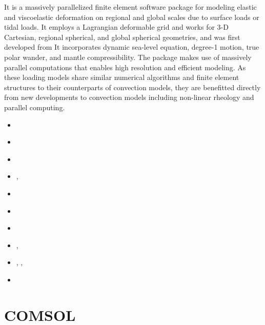 It is a massively parallelized finite element software package for modeling elastic 
and viscoelastic deformation on regional and global scales due to 
surface loads or tidal loads. 
It employs a Lagrangian deformable grid and works for 3-D Cartesian, 
regional spherical, and global spherical geometries, and was first developed from \citcoms
It incorporates dynamic sea-level equation, degree-1 motion, true polar wander, 
and mantle compressibility. The package makes use of massively parallel computations 
that enables high resolution and efficient modeling. 
As these loading models share similar numerical algorithms and finite element 
structures to their counterparts of convection models, they are benefitted directly 
from new developments to convection models including non-linear rheology and parallel computing. 

\begin{small}
\begin{itemize}
\item[\twothousandthree]      \textcite{zhpw03}
\item[\twothousandfive]       \textcite{pazw05}
\item[\twothousandtwelve]     \textcite{zhqa12}
\item[\twothousandthirteen]   \textcite{awzh13}, \textcite{zhwa13}
\item[\twothousandfourteen]   \textcite{awzh14}
\item[\twothousandsixteen]    \textcite{qizw16}
\item[\twothousandtwenty]     \textcite{bezw20}
\item[\twothousandtwentyone]  \textcite{bezh21a}, \textcite{bezh21b}
\item[\twothousandtwentytwo]  \textcite{kaza22}, \textcite{bezw22}, \textcite{zhka22}
\item[\twothousandtwentyfour] \textcite{fizm24} 
\end{itemize}
\end{small}


\section{COMSOL} 

